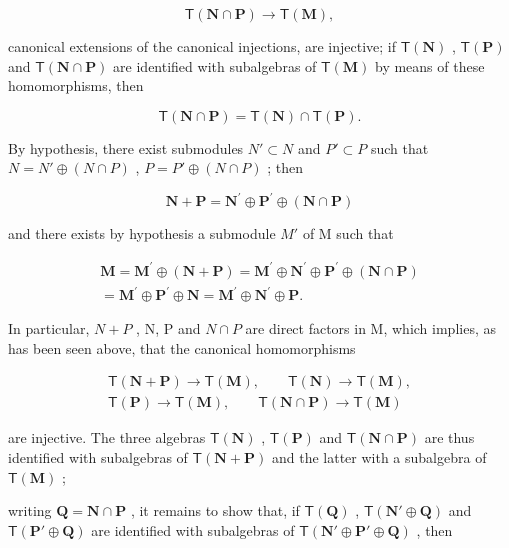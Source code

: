 \[
\mathsf {T} (\mathbf {N} \cap \mathbf {P}) \rightarrow \mathsf {T} (\mathbf {M}),
\]

canonical extensions of the canonical injections, are injective; if \(\mathsf{T}(\mathbf{N})\) , \(\mathsf{T}(\mathbf{P})\) and \(\mathsf{T}(\mathbf{N} \cap \mathbf{P})\) are identified with subalgebras of \(\mathsf{T}(\mathbf{M})\) by means of these homomorphisms, then

\[
\mathsf {T} (\mathbf {N} \cap \mathbf {P}) = \mathsf {T} (\mathbf {N}) \cap \mathsf {T} (\mathbf {P}).\tag{5}
\]

By hypothesis, there exist submodules \(N' \subset N\) and \(P' \subset P\) such that \(N = N' \oplus (N \cap P)\) , \(P = P' \oplus (N \cap P)\) ; then

\[
\mathbf {N} + \mathbf {P} = \mathbf {N} ^ {\prime} \oplus \mathbf {P} ^ {\prime} \oplus (\mathbf {N} \cap \mathbf {P})
\]

and there exists by hypothesis a submodule \(M'\) of M such that

\[
\begin{array}{c} \mathbf {M} = \mathbf {M} ^ {\prime} \oplus (\mathbf {N} + \mathbf {P}) = \mathbf {M} ^ {\prime} \oplus \mathbf {N} ^ {\prime} \oplus \mathbf {P} ^ {\prime} \oplus (\mathbf {N} \cap \mathbf {P}) \\ = \mathbf {M} ^ {\prime} \oplus \mathbf {P} ^ {\prime} \oplus \mathbf {N} = \mathbf {M} ^ {\prime} \oplus \mathbf {N} ^ {\prime} \oplus \mathbf {P}. \end{array}
\]

In particular, \(N + P\) , N, P and \(N \cap P\) are direct factors in M, which implies, as has been seen above, that the canonical homomorphisms

\[
\begin{array}{l} \mathsf {T} (\mathbf {N} + \mathbf {P}) \to \mathsf {T} (\mathbf {M}), \qquad \mathsf {T} (\mathbf {N}) \to \mathsf {T} (\mathbf {M}), \\ \mathsf {T} (\mathbf {P}) \to \mathsf {T} (\mathbf {M}), \qquad \mathsf {T} (\mathbf {N} \cap \mathbf {P}) \to \mathsf {T} (\mathbf {M}) \end{array}
\]

are injective. The three algebras \(\mathsf{T}(\mathbf{N})\) , \(\mathsf{T}(\mathbf{P})\) and \(\mathsf{T}(\mathbf{N} \cap \mathbf{P})\) are thus identified with subalgebras of \(\mathsf{T}(\mathbf{N} + \mathbf{P})\) and the latter with a subalgebra of \(\mathsf{T}(\mathbf{M})\) ;

writing \(\mathbf{Q} = \mathbf{N} \cap \mathbf{P}\) , it remains to show that, if \(\mathsf{T}(\mathbf{Q})\) , \(\mathsf{T}(\mathbf{N}' \oplus \mathbf{Q})\) and \(\mathsf{T}(\mathbf{P}' \oplus \mathbf{Q})\) are identified with subalgebras of \(\mathsf{T}(\mathbf{N}' \oplus \mathbf{P}' \oplus \mathbf{Q})\) , then

